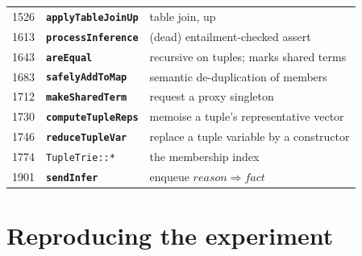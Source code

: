 \documentclass[11pt,a4paper]{article}
\newcommand{\code}[1]{\texttt{\small #1}}
\newcommand{\fn}[1]{\texttt{\small\bfseries #1}}
\theoremstyle{definition}
\begin{document}
\begin{center}
\begin{longtable}{@{}rlp{9.4cm}@{}}
1526& \fn{applyTableJoinUp}                 & table join, up\\
1613& \fn{processInference}                 & (dead) entailment-checked assert\\
1643& \fn{areEqual}                         & recursive on tuples; marks shared terms\\
1683& \fn{safelyAddToMap}                   & semantic de-duplication of members\\
1712& \fn{makeSharedTerm}                   & request a proxy singleton\\
1730& \fn{computeTupleReps}                 & memoise a tuple's representative vector\\
1746& \fn{reduceTupleVar}                   & replace a tuple variable by a constructor\\
1774& \code{TupleTrie::*}                   & the membership index\\
1901& \fn{sendInfer}                        & enqueue $\mathit{reason}\Rightarrow \mathit{fact}$\\
\bottomrule
\end{longtable}
\end{center}

\section{Reproducing the experiment}
\end{document}
